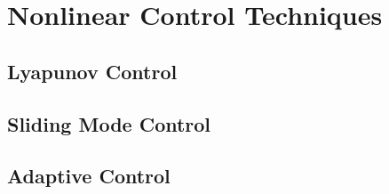 \section{Nonlinear Control Techniques}\label{s:nonlinear_controls}

\subsection{Lyapunov Control}

\subsection{Sliding Mode Control}

\subsection{Adaptive Control}